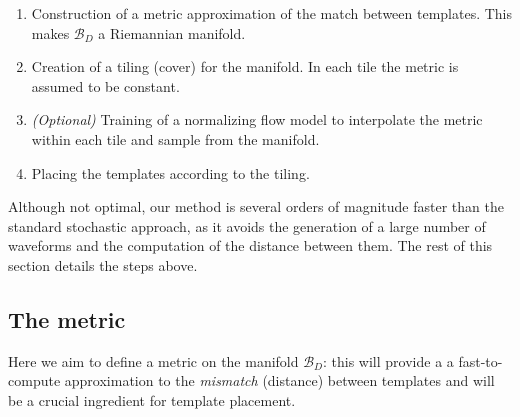 \documentclass[twocolumn,showpacs,preprintnumbers,nofootinbib,prd,
superscriptaddress,10pt]{revtex4-2}
\begin{document}
\begin{enumerate}
	\item Construction of a metric approximation of the match between templates. This makes $\mathcal{B}_D$ a Riemannian manifold.
	\item Creation of a tiling (cover) for the manifold. In each tile the metric is assumed to be constant.
	\item \textit{(Optional)} Training of a normalizing flow model to interpolate the metric within each tile and sample from the manifold. 
	\item Placing the templates according to the tiling.
\end{enumerate}
Although not optimal, our method is several orders of magnitude faster than the standard stochastic approach, as it avoids the generation of a large number of waveforms and the computation of the distance between them.
The rest of this section details the steps above.

\subsection{The metric} \label{sec:metric}

Here we aim to define a metric on the manifold $\mathcal{B}_D$: this will provide a a fast-to-compute approximation to the {\it mismatch} (distance) between templates and will be a crucial ingredient for template placement.
\end{document}
